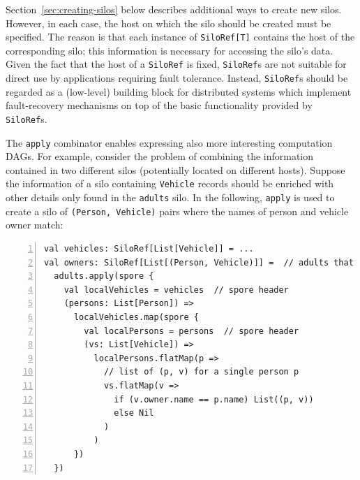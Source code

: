 \documentclass{jfp1}
\begin{document}
Section~\ref{sec:creating-silos} below describes additional ways to
create new silos. However, in each case, the host on which the silo
should be created must be specified. The reason is that each instance
of \verb|SiloRef[T]| contains the host of the corresponding silo; this
information is necessary for accessing the silo's data.  Given the
fact that the host of a \verb|SiloRef| is fixed, \verb|SiloRef|s are
not suitable for direct use by applications requiring fault
tolerance. Instead, \verb|SiloRef|s should be regarded as a
(low-level) building block for distributed systems which implement
fault-recovery mechanisms on top of the basic functionality provided
by \verb|SiloRef|s.

The \verb|apply| combinator enables expressing also more interesting
computation DAGs. For example, consider the problem of combining the
information contained in two different silos (potentially located on
different hosts). Suppose the information of a silo containing
\verb|Vehicle| records should be enriched with other details only
found in the \verb|adults| silo. In the following, \verb|apply| is
used to create a silo of \verb|(Person, Vehicle)| pairs where the
names of person and vehicle owner match:


\begin{lstlisting}[numbers=left,xleftmargin=2em,framexleftmargin=1.5em]
val vehicles: SiloRef[List[Vehicle]] = ...
val owners: SiloRef[List[(Person, Vehicle)]] =  // adults that own a vehicle
  adults.apply(spore {
    val localVehicles = vehicles  // spore header
    (persons: List[Person]) =>
      localVehicles.map(spore {
        val localPersons = persons  // spore header
        (vs: List[Vehicle]) =>
          localPersons.flatMap(p =>
            // list of (p, v) for a single person p
            vs.flatMap(v =>
              if (v.owner.name == p.name) List((p, v))
              else Nil
            )
          )
      })
  })
\end{lstlisting}
\end{document}
